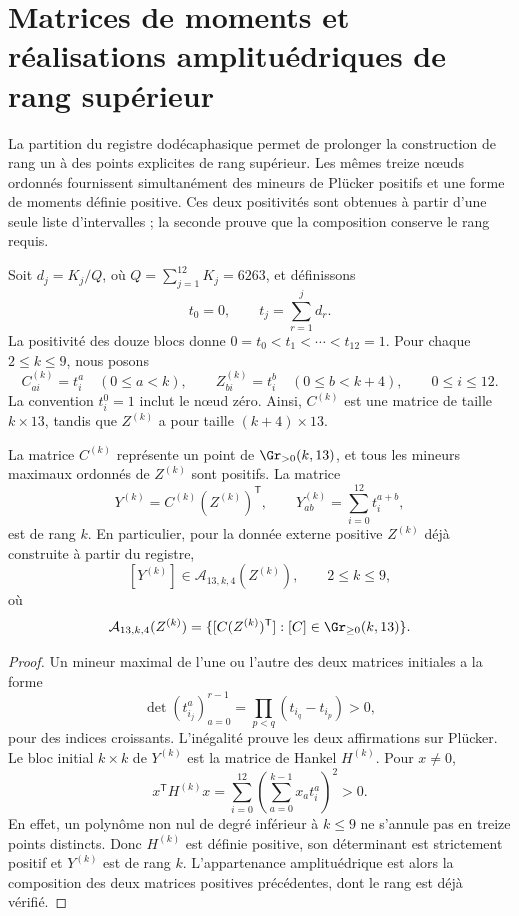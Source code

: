 \section{Matrices de moments et réalisations amplituédriques de rang supérieur}
\label{sec:higher-rank}
La partition du registre dodécaphasique permet de prolonger la construction de rang un à des points explicites de rang supérieur. Les mêmes treize nœuds ordonnés fournissent simultanément des mineurs de Plücker positifs et une forme de moments définie positive. Ces deux positivités sont obtenues à partir d'une seule liste d'intervalles ; la seconde prouve que la composition conserve le rang requis.

Soit \(d_j=K_j/Q\), où \(Q=\sum_{j=1}^{12}K_j=6263\), et définissons
\[
 t_0=0,\qquad t_j=\sum_{r=1}^jd_r.
\]
La positivité des douze blocs donne
\(0=t_0<t_1<\cdots<t_{12}=1\). Pour chaque \(2\le k\le9\), nous posons
\[
 C^{(k)}_{ai}=t_i^a\quad(0\le a<k),\qquad
 Z^{(k)}_{bi}=t_i^b\quad(0\le b<k+4),\qquad 0\le i\le12.
\]
La convention \(t_i^0=1\) inclut le nœud zéro. Ainsi, \(C^{(k)}\)
est une matrice de taille \(k\times13\), tandis que \(Z^{(k)}\) a pour
taille \((k+4)\times13\).

\begin{theorem}
La matrice \(C^{(k)}\) représente un point de \(\Gr_{>0}(k,13)\), et tous les mineurs maximaux ordonnés de \(Z^{(k)}\) sont positifs. La matrice
\[
 Y^{(k)}=C^{(k)}(Z^{(k)})^{\mathsf T},\qquad
 Y^{(k)}_{ab}=\sum_{i=0}^{12}t_i^{a+b},
\]
est de rang \(k\). En particulier, pour la donnée externe positive
\(Z^{(k)}\) déjà construite à partir du registre,
\[
 [Y^{(k)}]\in\mathcal A_{13,k,4}(Z^{(k)}),\qquad 2\le k\le9,
\]
où
\[
 \mathcal A_{13,k,4}(Z^{(k)})
 =\{[C(Z^{(k)})^{\mathsf T}]:[C]\in\Gr_{\ge0}(k,13)\}.
\]
\end{theorem}
\begin{proof}
Un mineur maximal de l’une ou l’autre des deux matrices initiales a la forme
\[
 \det(t_{i_j}^{a})_{a=0}^{r-1}
 =\prod_{p<q}(t_{i_q}-t_{i_p})>0,
\]
pour des indices croissants. L'inégalité prouve les deux affirmations sur Plücker. Le bloc initial \(k\times k\) de \(Y^{(k)}\) est la matrice de Hankel \(H^{(k)}\). Pour \(x\ne0\),
\[
 x^{\mathsf T}H^{(k)}x
 =\sum_{i=0}^{12}\left(\sum_{a=0}^{k-1}x_at_i^a\right)^2>0.
\]
En effet, un polynôme non nul de degré inférieur à \(k\le9\) ne
s’annule pas en treize points distincts. Donc \(H^{(k)}\) est définie positive,
son déterminant est strictement positif et \(Y^{(k)}\) est de rang
\(k\). L’appartenance amplituédrique est alors la composition des
deux matrices positives précédentes, dont le rang est déjà vérifié.
\end{proof}

